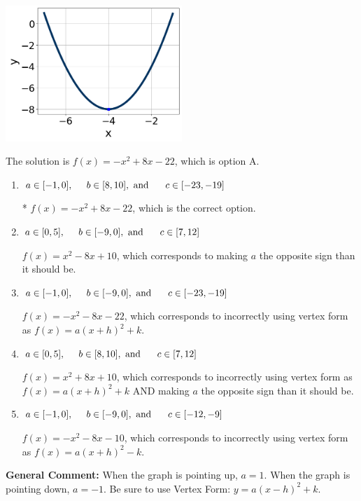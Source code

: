 \documentclass{extbook}[14pt]
\begin{document}
\begin{enumerate}
{\begin{center}
    \includegraphics[width=0.5\textwidth]{../Figures/quadraticGraphToEquationA.png}
\end{center}



The solution is \( f(x) = -x^{2} +8 x -22 \), which is option A.\begin{enumerate}[label=\Alph*.]
\item \( a \in [-1, 0], \hspace*{5mm} b \in [8, 10], \text{ and } \hspace*{5mm} c \in [-23, -19] \)

* $f(x)=-x^{2} +8 x -22$, which is the correct option.
\item \( a \in [0, 5], \hspace*{5mm} b \in [-9, 0], \text{ and } \hspace*{5mm} c \in [7, 12] \)

$f(x)=x^{2} -8 x + 10$, which corresponds to making $a$ the opposite sign than it should be.
\item \( a \in [-1, 0], \hspace*{5mm} b \in [-9, 0], \text{ and } \hspace*{5mm} c \in [-23, -19] \)

$f(x)=-x^{2} -8 x -22$, which corresponds to incorrectly using vertex form as $f(x) = a(x+h)^2+k$.
\item \( a \in [0, 5], \hspace*{5mm} b \in [8, 10], \text{ and } \hspace*{5mm} c \in [7, 12] \)

$f(x)=x^{2} +8 x + 10$, which corresponds to incorrectly using vertex form as $f(x) = a(x+h)^2+k$ AND making $a$ the opposite sign than it should be.
\item \( a \in [-1, 0], \hspace*{5mm} b \in [-9, 0], \text{ and } \hspace*{5mm} c \in [-12, -9] \)

$f(x)=-x^{2} -8 x -10$, which corresponds to incorrectly using vertex form as $f(x) = a(x+h)^2 - k$.
\end{enumerate}

\textbf{General Comment:} When the graph is pointing up, $a=1$. When the graph is pointing down, $a=-1$. Be sure to use Vertex Form: $y = a(x-h)^2+k$.
}
\end{enumerate}
\end{document}
